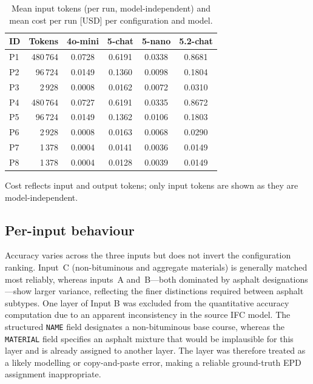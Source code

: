 \documentclass[10pt, a4paper, twocolumn]{article}
\begin{document}
\begin{table}[htbp]
  \caption{Mean input tokens (per run, model-independent) and mean cost per run [USD]
           per configuration and model.}
  \label{tab:cost}
  \centering
  \small
  \begin{tabular}{lrcccc}
    \toprule
    \textbf{ID}  & \textbf{Tokens} & \textbf{4o-mini} & \textbf{5-chat} & \textbf{5-nano} & \textbf{5.2-chat} \\
    \midrule
    P1     & 480\,764 & 0.0728 & 0.6191 & 0.0338 & 0.8681 \\
    P2        &  96\,724 & 0.0149 & 0.1360 & 0.0098 & 0.1804 \\
    P3       &   2\,928 & 0.0008 & 0.0162 & 0.0072 & 0.0310 \\
    P4     & 480\,764 & 0.0727 & 0.6191 & 0.0335 & 0.8672 \\
    P5    &  96\,724 & 0.0149 & 0.1362 & 0.0106 & 0.1803 \\
    P6   &   2\,928 & 0.0008 & 0.0163 & 0.0068 & 0.0290 \\
    P7  &   1\,378 & 0.0004 & 0.0141 & 0.0036 & 0.0149 \\
    P8          &   1\,378 & 0.0004 & 0.0128 & 0.0039 & 0.0149 \\
    \bottomrule
  \end{tabular}
\end{table}

Cost reflects input and output tokens; only input tokens are shown as they are model-independent.

\subsection{Per-input behaviour}

Accuracy varies across the three inputs but does not invert the configuration ranking.
Input~C (non-bituminous and aggregate materials) is generally matched most reliably,
whereas inputs~A and~B---both dominated by asphalt designations---show larger
variance, reflecting the finer distinctions required between asphalt subtypes. 
One layer of Input B was excluded from the quantitative accuracy computation due to an apparent inconsistency in the source IFC model. The structured \texttt{NAME} field designates a non-bituminous base course, whereas the \texttt{MATERIAL} field specifies an asphalt mixture that would be implausible for this layer and is already assigned to another layer. The layer was therefore treated as a likely modelling or copy-and-paste error, making a reliable ground-truth EPD assignment inappropriate.
\end{document}
